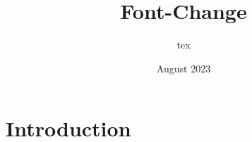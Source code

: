 \documentclass{article}
\title{Font-Change}
\author{tex }
\date{August 2023}
\begin{document}
\maketitle

\section{Introduction}
\end{document}
